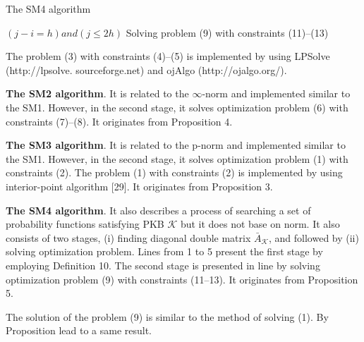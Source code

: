 \documentclass[]{iosart2c}
\begin{document}
    \begin{algorithm}
        \caption{The SM4 algorithm}
        \begin{algorithmic}[1]

                    \ElsIf
                            {$(j - i = h ) and (j \leq 2h)$}
                    \Else
                    \EndIf
                \EndFor
            \EndFor
            \State Solving problem (9) with constraints (11)–(13)
            \State {}
        \end{algorithmic}
    \end{algorithm}

    The problem (3) with constraints (4)–(5) is implemented by using LPSolve (http://lpsolve. sourceforge.net) and ojAlgo (http://ojalgo.org/).

    \textbf{The SM2 algorithm}. It is related to the $\infty$-norm and implemented similar to the SM1. However, in the second stage, it solves optimization problem (6) with constraints (7)–(8). It originates from Proposition 4.

    \textbf{The SM3 algorithm}. It is related to the p-norm and implemented similar to the SM1. However, in the second stage, it solves optimization problem (1) with constraints (2). The problem (1) with constraints (2) is implemented by using interior-point algorithm [29]. It originates from Proposition 3.

    \textbf{The SM4 algorithm}. It also describes a process of searching a set of probability functions satisfying PKB $\mathcal{K}$ but it does not base on norm. It also consists of two stages, (i) finding diagonal double matrix $\bar{A}_\mathcal{K}$, and followed by (ii) solving optimization problem. Lines from 1 to 5 present the first stage by employing Definition 10. The second stage is presented in line by solving optimization problem (9) with constraints (11–13). It originates from Proposition 5.

    The solution of the problem (9) is similar to the method of solving (1). By Proposition lead to a same result.
\end{document}
